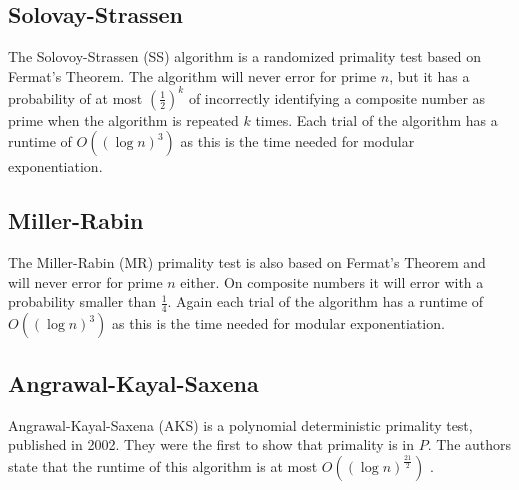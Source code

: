 \subsection{Solovay-Strassen} \label{sec:SS_theory}
The Solovoy-Strassen (SS) algorithm is a randomized primality test based on Fermat's Theorem.
The algorithm will never error for prime $n$,
but it has a probability of at most $(\frac{1}{2})^k$ of incorrectly identifying a composite number as prime when the algorithm is repeated $k$ times.
Each trial of the algorithm has a runtime of $O((\log n)^3)$ as this is the time needed for modular exponentiation.

\subsection{Miller-Rabin} \label{sec:MR_theory}
The Miller-Rabin (MR) primality test is also based on Fermat's Theorem and will never error for prime $n$ either.
On composite numbers it will error with a probability smaller than $\frac{1}{4}$. \cite{MR}
Again each trial of the algorithm has a runtime of $O((\log n)^3)$ as this is the time needed for modular exponentiation.

\subsection{Angrawal-Kayal-Saxena} \label{sec:AKS_theory}
Angrawal-Kayal-Saxena (AKS) is a polynomial deterministic primality test, published in 2002.
They were the first to show that primality is in $P$.
The authors state that the runtime of this algorithm is at most $O((\log n)^{\frac{21}{2}})$ \cite{AKS}.


